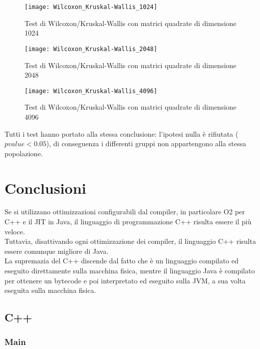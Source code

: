 \begin{figure}[!htbp]
  \centering
  \texttt{[image: Wilcoxon\_Kruskal-Wallis\_1024]}
  \caption{Test di Wilcoxon/Kruskal-Wallis con matrici quadrate di dimensione 1024}
  \label{Wilcoxon_Kruskal-Wallis_1024}
\end{figure}

\clearpage

\begin{figure}[!htbp]
  \texttt{[image: Wilcoxon\_Kruskal-Wallis\_2048]}
  \caption{Test di Wilcoxon/Kruskal-Wallis con matrici quadrate di dimensione 2048}
  \label{Wilcoxon_Kruskal-Wallis_2048}
\end{figure}

\clearpage

\begin{figure}[!htbp]
  \texttt{[image: Wilcoxon\_Kruskal-Wallis\_4096]}
  \caption{Test di Wilcoxon/Kruskal-Wallis con matrici quadrate di dimensione 4096}
  \label{Wilcoxon_Kruskal-Wallis_4096}
\end{figure}

Tutti i test hanno portato alla stessa conclusione: l'ipotesi nulla è
rifiutata ($pvalue < 0.05$), di conseguenza i differenti gruppi non appartengono
alla stessa popolazione.\\

\clearpage

\section{Conclusioni}
Se si utilizzano ottimizzazioni configurabili dal compiler, in particolare O2
per C++ e il JIT in Java, il linguaggio di programmazione C++ risulta essere il
più veloce.\\
Tuttavia, disattivando ogni ottimizzazione dei compiler, il linguaggio C++
risulta essere comunque migliore di Java.\\
La supremazia del C++ discende dal fatto che è un linguaggio compilato ed
eseguito direttamente sulla macchina fisica, mentre il linguaggio Java è compilato
per ottenere un bytecode e poi interpretato ed eseguito sulla JVM, a sua volta
eseguita sulla macchina fisica.

\subsection{C++}
\subsubsection{Main}


